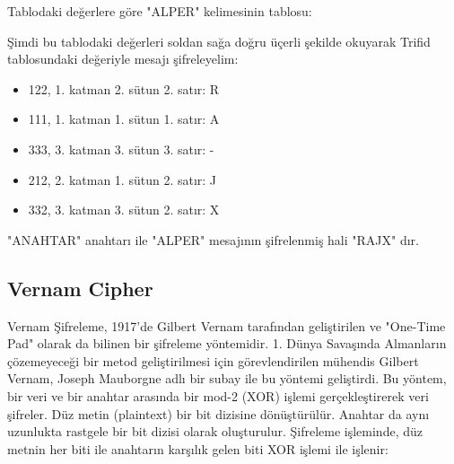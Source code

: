 \newpage

\begin{table}[ht]
\centering
{}
\end{table}

Tablodaki değerlere göre "ALPER" kelimesinin tablosu:

\begin{table}[ht]
\centering
{}
\end{table}

Şimdi bu tablodaki değerleri soldan sağa doğru üçerli şekilde okuyarak Trifid tablosundaki değeriyle mesajı şifreleyelim:

\begin{itemize}
    \item 122, 1. katman 2. sütun 2. satır: R 
    \item 111, 1. katman 1. sütun 1. satır: A
    \item 333, 3. katman 3. sütun 3. satır: -
    \item 212, 2. katman 1. sütun 2. satır: J
    \item 332, 3. katman 3. sütun 2. satır: X
\end{itemize}

"ANAHTAR" anahtarı ile "ALPER" mesajının şifrelenmiş hali "RAJX" dır.

\newpage

\subsection{Vernam Cipher}

Vernam Şifreleme, 1917'de Gilbert Vernam tarafından geliştirilen ve "One-Time Pad" olarak da bilinen bir şifreleme yöntemidir. 1. Dünya Savaşında Almanların çözemeyeceği bir metod geliştirilmesi için görevlendirilen mühendis Gilbert Vernam, Joseph Mauborgne adlı bir subay ile bu yöntemi geliştirdi. Bu yöntem, bir veri ve bir anahtar arasında bir mod-2 (XOR) işlemi gerçekleştirerek veri şifreler. Düz metin (plaintext) bir bit dizisine dönüştürülür. Anahtar da aynı uzunlukta rastgele bir bit dizisi olarak oluşturulur. Şifreleme işleminde, düz metnin her biti ile anahtarın karşılık gelen biti XOR işlemi ile işlenir:

